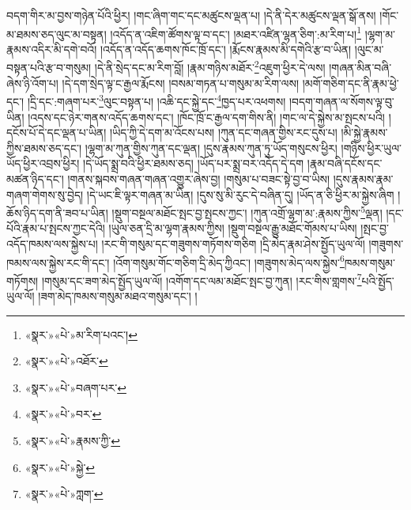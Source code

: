 བདག་གིར་མ་བྱས་གཉེན་པོའི་ཕྱིར། །གང་ཞིག་གང་དང་མཚུངས་ལྡན་པ། །དེ་ནི་དེར་མཚུངས་ལྡན་སྒོ་ནས། །གོང་མ་ཐམས་ཅད་ལུང་མ་བསྟན། །འདོད་ན་འཇིག་ཚོགས་ལྟ་བ་དང་། །མཐར་འཛིན་ལྷན་ཅིག་:མ་རིག་པ།\footnote{«སྣར་»«པེ་»མ་རིག་པའང་།} །ལྷག་མ་རྣམས་འདིར་མི་དགེ་བའོ། །འདོད་ན་འདོད་ཆགས་ཁོང་ཁྲོ་དང་། །རྨོངས་རྣམས་མི་དགེའི་རྩ་བ་ཡིན། །ལུང་མ་བསྟན་པའི་རྩ་བ་གསུམ། །དེ་ནི་སྲེད་དང་མ་རིག་བློ། །རྣམ་གཉིས་མཐོར་\footnote{«སྣར་»«པེ་»འཐོར་}འཇུག་ཕྱིར་དེ་ལས། །གཞན་མིན་བཞི་ཞེས་ཉི་འོག་པ། །དེ་དག་སྲེད་ལྟ་ང་རྒྱལ་རྨོངས། །བསམ་གཏན་པ་གསུམ་མ་རིག་ལས། །མགོ་གཅིག་དང་ནི་རྣམ་ཕྱེ་དང་། །དྲི་དང་:གཞག་པར་\footnote{«སྣར་»«པེ་»བཞག་པར་}ལུང་བསྟན་པ། །འཆི་དང་སྐྱེ་དང་\footnote{«སྣར་»«པེ་»བར་}ཁྱད་པར་འཕགས། །བདག་གཞན་ལ་སོགས་ལྟ་བུ་ཡིན། །འདས་དང་ཉེར་གནས་འདོད་ཆགས་དང་། །ཁོང་ཁྲོ་ང་རྒྱལ་དག་གིས་ནི། །གང་ལ་དེ་སྐྱེས་མ་སྤངས་པའི། །དངོས་པོ་དེ་དང་ལྡན་པ་ཡིན། །ཡིད་ཀྱི་དེ་དག་མ་འོངས་པས། །ཀུན་དང་གཞན་གྱིས་རང་དུས་པ། །མི་སྐྱེ་རྣམས་ཀྱིས་ཐམས་ཅད་དང་། །ལྷག་མ་ཀུན་གྱིས་ཀུན་དང་ལྡན། །དུས་རྣམས་ཀུན་ཏུ་ཡོད་གསུངས་ཕྱིར། །གཉིས་ཕྱིར་ཡུལ་ཡོད་ཕྱིར་འབྲས་ཕྱིར། །དེ་ཡོད་སྨྲ་བའི་ཕྱིར་ཐམས་ཅད། །ཡོད་པར་སྨྲ་བར་འདོད་དེ་དག །རྣམ་བཞི་དངོས་དང་མཚན་ཉིད་དང་། །གནས་སྐབས་གཞན་གཞན་འགྱུར་ཞེས་བྱ། །གསུམ་པ་བཟང་སྟེ་བྱ་བ་ཡིས། །དུས་རྣམས་རྣམ་གཞག་གེགས་སུ་བྱེད། །དེ་ཡང་ཇི་ལྟར་གཞན་མ་ཡིན། །དུས་སུ་མི་རུང་དེ་བཞིན་དུ། །ཡོད་ན་ཅི་ཕྱིར་མ་སྐྱེས་ཞིག །ཆོས་ཉིད་དག་ནི་ཟབ་པ་ཡིན། །སྡུག་བསྔལ་མཐོང་སྤང་བྱ་སྤངས་ཀྱང་། །ཀུན་འགྲོ་ལྷག་མ་:རྣམས་ཀྱིས་\footnote{«སྣར་»«པེ་»རྣམས་ཀྱི་}ལྡན། །དང་པོའི་རྣམ་པ་སྤངས་ཀྱང་དེའི། །ཡུལ་ཅན་དྲི་མ་ལྷག་རྣམས་ཀྱིས། །སྡུག་བསྔལ་རྒྱུ་མཐོང་གོམས་པ་ཡིས། །སྤང་བྱ་འདོད་ཁམས་ལས་སྐྱེས་པ། །རང་གི་གསུམ་དང་གཟུགས་གཏོགས་གཅིག །དྲི་མེད་རྣམ་ཤེས་སྤྱོད་ཡུལ་ལོ། །གཟུགས་ཁམས་ལས་སྐྱེས་རང་གི་དང་། །འོག་གསུམ་གོང་གཅིག་དྲི་མེད་ཀྱིའང་། །གཟུགས་མེད་ལས་སྐྱེས་\footnote{«སྣར་»«པེ་»སྐྱེ་}ཁམས་གསུམ་གཏོགས། །གསུམ་དང་ཟག་མེད་སྤྱོད་ཡུལ་ལོ། །འགོག་དང་ལམ་མཐོང་སྤང་བྱ་ཀུན། །རང་གིས་གླགས་\footnote{«སྣར་»«པེ་»ཀླག་}པའི་སྤྱོད་ཡུལ་ལོ། །ཟག་མེད་ཁམས་གསུམ་མཐའ་གསུམ་དང་། །
